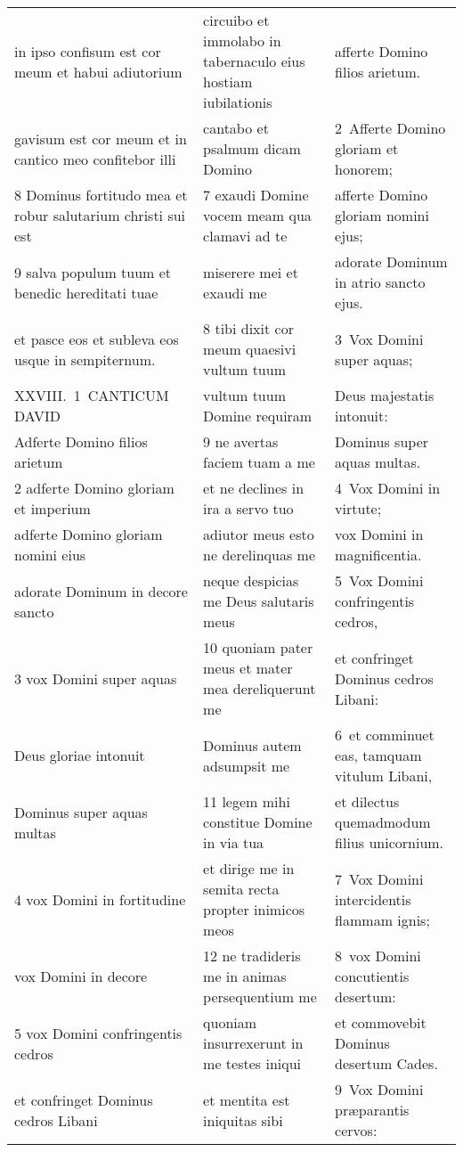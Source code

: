 \documentclass{article}
\begin{document}
\begin{longtable}{@{}p{}p{}p{}@{}}
in ipso confisum est cor meum et habui adiutorium	&	circuibo et immolabo in tabernaculo eius hostiam iubilationis	&	afferte Domino filios arietum.	\\
gavisum est cor meum et in cantico meo confitebor illi	&	cantabo et psalmum dicam Domino	&	2 Afferte Domino gloriam et honorem;	\\
8 Dominus fortitudo mea et robur salutarium christi sui est	&	7 exaudi Domine vocem meam qua clamavi ad te	&	afferte Domino gloriam nomini ejus;	\\
9 salva populum tuum et benedic hereditati tuae	&	miserere mei et exaudi me	&	adorate Dominum in atrio sancto ejus.	\\
et pasce eos et subleva eos usque in sempiternum.	&	8 tibi dixit cor meum quaesivi vultum tuum	&	3 Vox Domini super aquas;	\\
XXVIII. 1 CANTICUM DAVID	&	vultum tuum Domine requiram	&	Deus majestatis intonuit:	\\
Adferte Domino filios arietum	&	9 ne avertas faciem tuam a me	&	Dominus super aquas multas.	\\
2 adferte Domino gloriam et imperium	&	et ne declines in ira a servo tuo	&	4 Vox Domini in virtute;	\\
adferte Domino gloriam nomini eius	&	adiutor meus esto ne derelinquas me	&	vox Domini in magnificentia.	\\
adorate Dominum in decore sancto	&	neque despicias me Deus salutaris meus	&	5 Vox Domini confringentis cedros,	\\
3 vox Domini super aquas	&	10 quoniam pater meus et mater mea dereliquerunt me	&	et confringet Dominus cedros Libani:	\\
Deus gloriae intonuit	&	Dominus autem adsumpsit me	&	6 et comminuet eas, tamquam vitulum Libani,	\\
Dominus super aquas multas	&	11 legem mihi constitue Domine in via tua	&	et dilectus quemadmodum filius unicornium.	\\
4 vox Domini in fortitudine	&	et dirige me in semita recta propter inimicos meos	&	7 Vox Domini intercidentis flammam ignis;	\\
vox Domini in decore	&	12 ne tradideris me in animas persequentium me	&	8 vox Domini concutientis desertum:	\\
5 vox Domini confringentis cedros	&	quoniam insurrexerunt in me testes iniqui	&	et commovebit Dominus desertum Cades.	\\
et confringet Dominus cedros Libani	&	et mentita est iniquitas sibi	&	9 Vox Domini præparantis cervos:	\\

\end{longtable}
\end{document}
